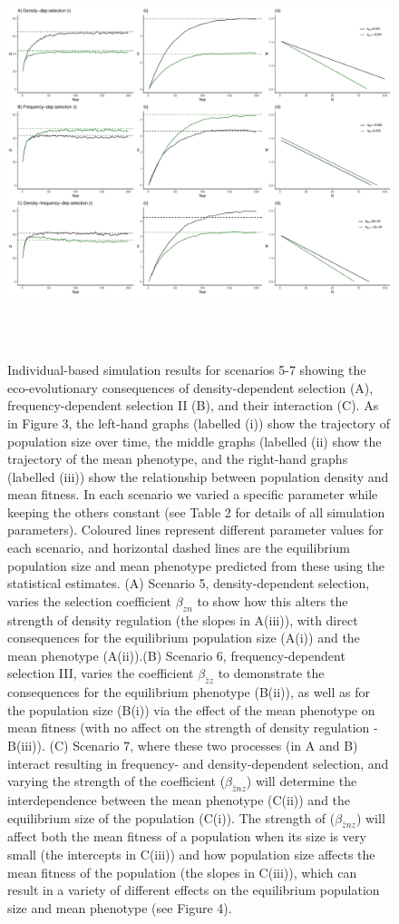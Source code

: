 \documentclass{article}
\begin{document}
\begin{figure} [H]
	\centering
	\includegraphics[width=12cm, height=12cm]{Figures/Fig4.pdf}
	\caption{Individual-based simulation results for scenarios 5-7 showing the eco-evolutionary consequences of density-dependent selection (A), frequency-dependent selection II (B), and their interaction (C). As in Figure 3, the left-hand graphs (labelled (i)) show the trajectory of population size over time, the middle graphs (labelled (ii) show the trajectory of the mean phenotype, and the right-hand graphs (labelled (iii)) show the relationship between population density and mean fitness. In each scenario we varied a specific parameter while keeping the others constant (see Table 2 for details of all simulation parameters). Coloured lines represent different parameter values for each scenario, and horizontal dashed lines are the equilibrium population size and mean phenotype predicted from these using the statistical estimates. (A) Scenario 5, density-dependent selection, varies the selection coefficient $\beta_{zn}$ to show how this alters the strength of density regulation (the slopes in A(iii)), with direct consequences for the equilibrium population size (A(i)) and the mean phenotype (A(ii)).(B) Scenario 6, frequency-dependent selection III, varies the coefficient $\beta_{\bar{z}z}$ to demonstrate the consequences for the equilibrium phenotype (B(ii)), as well as for the population size (B(i)) via the effect of the mean phenotype on mean fitness (with no affect on the strength of density regulation - B(iii)). (C) Scenario 7, where these two processes (in A and B) interact resulting in frequency- and density-dependent selection, and varying the strength of the coefficient ($\beta_{\bar{z}nz}$) will determine the interdependence between the mean phenotype (C(ii)) and the equilibrium size of the population (C(i)). The strength of ($\beta_{\bar{z}nz}$) will affect both the mean fitness of a population when its size is very small (the intercepts in C(iii)) and how population size affects the mean fitness of the population (the slopes in C(iii)), which can result in a variety of different effects on the equilibrium population size and mean phenotype (see Figure 4).} 

\end{figure}
\end{document}

